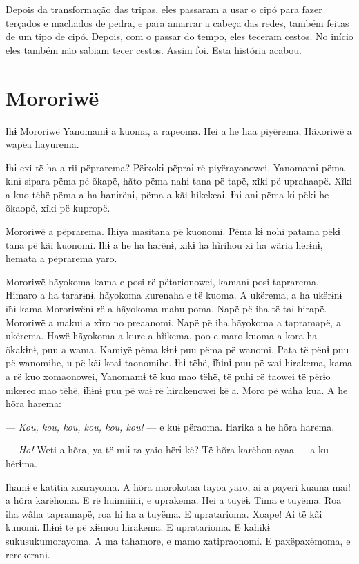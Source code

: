 Depois da transformação das tripas, eles passaram a usar o cipó para
fazer terçados e machados de pedra, e para amarrar a cabeça das redes,
também feitas de um tipo de cipó. Depois, com o passar do tempo, eles
teceram cestos. No início eles também não sabiam tecer cestos. Assim
foi. Esta história acabou.

\chapter{Mororiwë}

Ɨhɨ Mororiwë Yanomamɨ a kuoma, a rapeoma. Hei a he haa piyërema,
Hãxoriwë a wapëa hayurema. 

Ɨhɨ exi të ha a rii pëprarema? Pëɨxokɨ pëpraɨ rë piyërayonowei. Yanomamɨ
pëma kɨnɨ sipara pëma pë õkapë, hãto pëma nahi tana pë tapë, xĩki pë
uprahaapë. Xĩki a kuo tëhë pëma a ha hanɨrënɨ, pëma a kãi hikekeaɨ. Ɨhɨ
anɨ pëma kɨ pëkɨ he õkaopë, xĩki pë kupropë. 

Mororiwë a pëprarema. Ihiya masitana pë kuonomi. Pëma kɨ nohi patama
pëkɨ tana pë kãi kuonomi. Ɨhɨ a he ha harënɨ, xikɨ ha hĩrihou xi ha
wãria hërɨnɨ, hemata a pëprarema yaro. 

Mororiwë hãyokoma kama e posi rë pëtarionowei, kamanɨ posi taprarema.
Himaro a ha tararɨnɨ, hãyokoma kurenaha e të kuoma. A ukërema, a ha
ukërɨnɨ ɨ̃hɨ kama Mororiwënɨ rë a hãyokoma mahu poma. Napë pë iha të taɨ
hirapë. Mororiwë a makui a xĩro no preaanomi. Napë pë iha hãyokoma a
tapramapë, a ukërema. Hawë hãyokoma a kure a hĩikema, poo e maro kuoma a
kora ha õkakɨnɨ, puu a wama. Kamiyë pëma kɨnɨ puu pëma pë wanomi. Pata
të pënɨ puu pë wanomihe, u pë kãi koaɨ taonomihe. Ɨhɨ tëhë, ɨ̃hɨnɨ puu pë
waɨ hirakema, kama a rë kuo xomaonowei, Yanomamɨ të kuo mao tëhë, të
puhi rë taowei të përɨo nikereo mao tëhë, ɨ̃hɨnɨ puu pë waɨ rë
hirakenowei kë a. Moro pë wãha kua. A he hõra harema: 

--- \textit{Kou, kou, kou, kou, kou, kou!} --- e kuɨ përaoma. Harika a he hõra
harema. 

--- \textit{Ho!} Weti a hõra, ya të mɨɨ ta yaio hërɨ kë? Të hõra karëhou ayaa --- a
ku hërɨma. 

Ɨhamɨ e katitia xoarayoma. A hõra morokotaa tayoa yaro, ai a payeri
kuama mai! a hõra karëhoma. E rë huimiiiiii, e uprakema. Hei a tuyëɨ.
Tima e tuyëma. Roa iha wãha tapramapë, roa hi ha a tuyëma. E upratarioma. Xoape! Ai të kãi kunomi. Ɨhɨnɨ të pë xɨɨmou hirakema. E upratarioma. E kahikɨ sukusukumorayoma. A ma tahamore, e mamo
xatipraonomi. E paxëpaxëmoma, e rerekeranɨ. 

